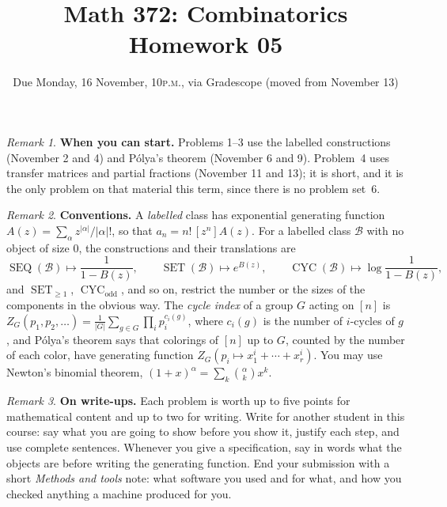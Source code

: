 \documentclass[11pt,twoside]{amsart}
\title{Math 372: Combinatorics\\ Homework 05}
\author{Due Monday, 16 November, 10\textsc{p.m.}, via Gradescope (moved from November 13)}
\theoremstyle{plain}
\theoremstyle{remark}
\newtheorem*{rmk*}{Remark}
\theoremstyle{definition}
\newcommand{\SEQ}{\operatorname{SEQ}}
\newcommand{\SET}{\operatorname{SET}}
\newcommand{\CYC}{\operatorname{CYC}}
\begin{document}
\maketitle

\begin{rmk*}
\textbf{When you can start.} Problems 1--3 use the labelled constructions (November 2 and 4) and
Pólya's theorem (November 6 and 9). Problem~4 uses transfer matrices and partial fractions (November 11
and 13); it is short, and it is the only problem on that material this term, since there is no
problem set~6.
\end{rmk*}

\begin{rmk*}
\textbf{Conventions.} A \emph{labelled} class has exponential generating function
$A(z)=\sum_\alpha z^{|\alpha|}/|\alpha|!$, so that $a_n=n!\,[z^n]A(z)$. For a labelled class
$\mathcal B$ with no object of size $0$, the constructions and their translations are
\[
\SEQ(\mathcal B)\mapsto\frac1{1-B(z)},\qquad
\SET(\mathcal B)\mapsto e^{B(z)},\qquad
\CYC(\mathcal B)\mapsto\log\frac1{1-B(z)},
\]
and $\SET_{\ge1}$, $\CYC_{\text{odd}}$, and so on, restrict the number or the sizes of the
components in the obvious way. The \emph{cycle index} of a group $G$ acting on $[n]$ is
$Z_G(p_1,p_2,\dots)=\frac1{|G|}\sum_{g\in G}\prod_i p_i^{c_i(g)}$, where $c_i(g)$ is the number
of $i$-cycles of $g$, and Pólya's theorem says that colorings of $[n]$ up to $G$, counted by the
number of each color, have generating function $Z_G(p_i\mapsto x_1^i+\cdots+x_r^i)$. You may use
Newton's binomial theorem, $(1+x)^\alpha=\sum_k\binom\alpha kx^k$.
\end{rmk*}

\begin{rmk*}
\textbf{On write-ups.} Each problem is worth up to five points for mathematical content and up to
two for writing. Write for another student in this course: say what you are going to show before
you show it, justify each step, and use complete sentences. Whenever you give a specification,
say in words what the objects are before writing the generating function. End your submission
with a short \emph{Methods and tools} note: what software you used and for what, and how you
checked anything a machine produced for you.
\end{rmk*}
\end{document}
